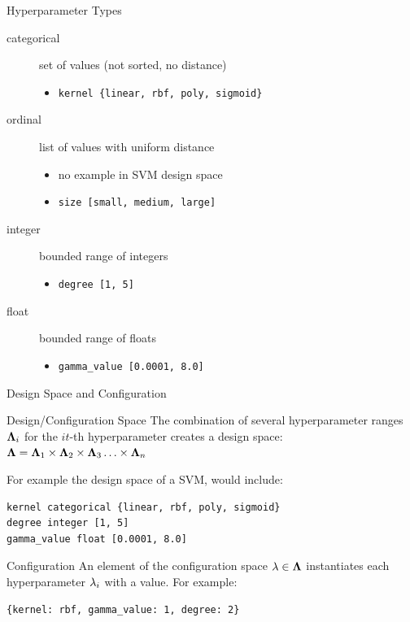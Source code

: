 \begin{frame}[c]{Hyperparameter Types}

\begin{description}
	\item[categorical] set of values (not sorted, no distance)
	\begin{itemize}
	  \item \texttt{kernel \{linear, rbf, poly, sigmoid\}}
	\end{itemize}
	\pause
	\item[ordinal] list of values with uniform distance
	\begin{itemize}
	  \item no example in SVM design space
	  \item \texttt{size [small, medium, large]}
	\end{itemize}
	\pause
	\item[integer] bounded range of integers
	\begin{itemize}
	  \item \texttt{degree [1, 5]}
	\end{itemize}
	\pause
	\item[float] bounded range of floats
	\begin{itemize}
	  \item \texttt{gamma\_value [0.0001, 8.0]}
	\end{itemize}
\end{description}

\end{frame}
\begin{frame}[c,fragile]{Design Space and Configuration}

\begin{block}{Design/Configuration Space}
The combination of several hyperparameter ranges $\mathbf{\Lambda}_i$ for the $it$-th hyperparameter creates a design space:
$\mathbf{\Lambda} = \mathbf{\Lambda}_1 \times \mathbf{\Lambda}_2 \times \mathbf{\Lambda}_3 \ldots \times \mathbf{\Lambda}_n$ 

\pause
\bigskip

For example the design space of a SVM, would include:

\begin{verbatim}
kernel categorical {linear, rbf, poly, sigmoid}
degree integer [1, 5]
gamma_value float [0.0001, 8.0]
\end{verbatim}
\end{block}

\pause

\begin{block}{Configuration}
An element of the configuration space $\mathbf{\lambda} \in \mathbf{\Lambda}$ instantiates each hyperparameter $\mathbf{\lambda}_i$ with a value.
For example:
\begin{verbatim}
{kernel: rbf, gamma_value: 1, degree: 2}
\end{verbatim}

\end{block}

\end{frame}
